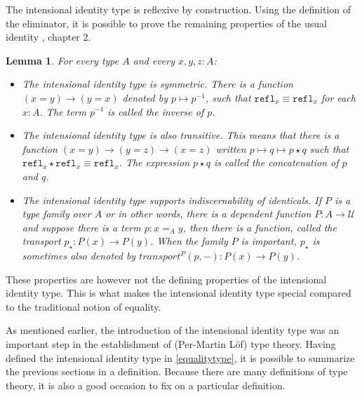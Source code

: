 \documentclass[12pt,a4paper,twoside,xetex]{book}
\newcommand{\keyword}[1]{\emph{#1}\index{#1}}
\newtheorem{lemma}[theorem]{Lemma}
\newcommand{\op}[1]{\mathtt{#1}}
\begin{document}



The intensional identity type is reflexive by construction. Using the 
definition of the eliminator, it is possible to prove the remaining properties 
of the usual identity \cite{Voevodsky2013}, chapter 2. 

\begin{lemma}
  For every type $A$ and every $x,y,z:A$:
  \begin{itemize}
  \item The intensional identity type is symmetric. There is a function 
$(x=y)\rightarrow (y=x)$ denoted by $p \mapsto p^{-1}$, such that 
$\op{refl}_x\equiv \op{refl}_x$ for each $x: A$. The term $p^{-1}$ is called 
the inverse of $p$.
  \item The intensional identity type is also transitive. This means that there 
is a function $(x=y)\rightarrow (y=z) \rightarrow (x=z)$ written $p \mapsto q 
\mapsto p \star q$ such that $\op{refl}_x \star \op{refl}_x \equiv 
\op{refl}_x$. The expression $ p \star q$ is called the \keyword{concatenation} 
of $p$ and $q$.
    \item The intensional identity type supports indiscernability of 
identicals. If $P$ is a type family over $A$ or in other words, there is a 
dependent function $P:A \rightarrow \mathcal{U}$ and suppose there is a term $p: 
x=_Ay$, then there is a function, called the transport $p_\star:P(x)\rightarrow 
P(y)$. When the family $P$ is important, $p_\star$ is sometimes also denoted by 
$transport^P(p,-):P(x) \rightarrow P(y)$.
    \end{itemize}
\end{lemma}

These properties are however not the defining properties of the intensional 
identity type. This is what makes the intensional identity type special 
compared to the traditional notion of equality.


As mentioned earlier, the introduction of the intensional identity type was an 
important step in the establishment of (Per-Martin L\"of) type theory. Having 
defined the intensional identity type in \cref{equalitytype}, it is possible to 
summarize the previous sections in a definition. Because there are many 
definitions of type theory, it is also a good occasion to fix on a particular 
definition.
\end{document}
